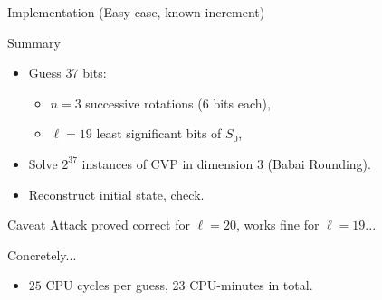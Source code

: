 

\begin{frame}{Implementation (Easy case, known increment)}



  \begin{block}{Summary}
    \begin{itemize}
    \item Guess 37 bits:
      \begin{itemize}
      \item \(n=3\) successive rotations (6 bits each),
      \item \(\ell=19\) least significant bits of \(S_0\),
      \end{itemize}
    \item Solve \(2^{37}\) instances of CVP in dimension 3 (Babai Rounding).
    \item Reconstruct initial state, check.
    \end{itemize}
  \end{block}

  \begin{alertblock}{Caveat}
    Attack proved correct for $\ell=20$, works fine for $\ell=19$...
  \end{alertblock}
  
  \begin{exampleblock}{Concretely...}
    \begin{itemize}
    \item $25$ CPU cycles per guess, 23 CPU-minutes in total.
    \end{itemize}
  \end{exampleblock}
  
\end{frame}
